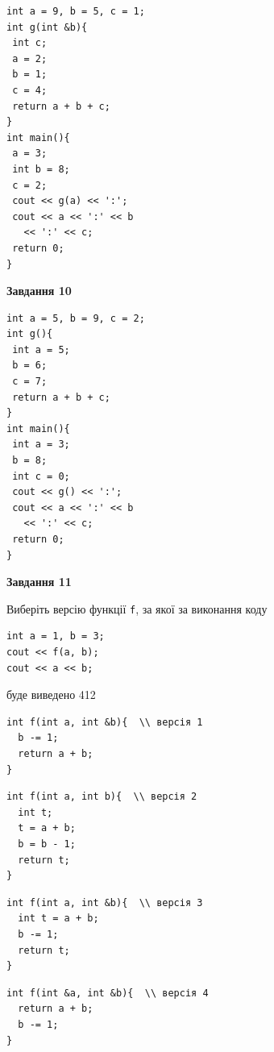 \documentclass[12pt, ukrainian]{article}
\def\code#1{\Verb!#1!}
\begin{document}
{\begin {large}
\begin{minipage}[t]{7.0cm}
\begin{verbatim}
int a = 9, b = 5, c = 1;
int g(int &b){
 int c;
 a = 2;
 b = 1;
 c = 4;
 return a + b + c;
}
int main(){
 a = 3;
 int b = 8;
 c = 2;
 cout << g(a) << ':';
 cout << a << ':' << b 
   << ':' << c;
 return 0;
}
\end{verbatim}



\begin{center}
\textbf{Завдання 10}
\end{center}
\vspace{-8mm}

\begin{verbatim}
int a = 5, b = 9, c = 2;
int g(){
 int a = 5;
 b = 6;
 c = 7;
 return a + b + c;
}
int main(){
 int a = 3;
 b = 8;
 int c = 0;
 cout << g() << ':';
 cout << a << ':' << b 
   << ':' << c;
 return 0;
}
\end{verbatim}

\end{minipage}
\vline \hspace{1mm}
\begin{minipage}[t]{11.0cm}

\begin{center}
\textbf{Завдання 11}
\end{center}
Виберіть версію функції \code{f}, за якої за виконання коду
\begin{verbatim}
int a = 1, b = 3;
cout << f(a, b);
cout << a << b;
\end{verbatim}

буде виведено 412

\begin{verbatim}
int f(int a, int &b){  \\ версія 1
  b -= 1;
  return a + b;
}
\end{verbatim}

\vspace{-8mm}\begin{verbatim}
int f(int a, int b){  \\ версія 2
  int t;
  t = a + b;
  b = b - 1;
  return t;
}
\end{verbatim}

\vspace{-8mm}\begin{verbatim}
int f(int a, int &b){  \\ версія 3
  int t = a + b;
  b -= 1;
  return t;
}
\end{verbatim}

\vspace{-8mm}\begin{verbatim}
int f(int &a, int &b){  \\ версія 4
  return a + b;
  b -= 1;
}
\end{verbatim}




\end{minipage}
\end{large}}
\end{document}
